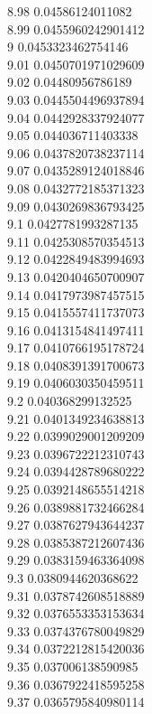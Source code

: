 {8.98	0.04586124011082\\
8.99	0.0455960242901412\\
9	0.0453323462754146\\
9.01	0.0450701971029609\\
9.02	0.04480956786189\\
9.03	0.0445504496937894\\
9.04	0.0442928337924077\\
9.05	0.044036711403338\\
9.06	0.0437820738237114\\
9.07	0.0435289124018846\\
9.08	0.0432772185371323\\
9.09	0.0430269836793425\\
9.1	0.0427781993287135\\
9.11	0.0425308570354513\\
9.12	0.0422849483994693\\
9.13	0.0420404650700907\\
9.14	0.0417973987457515\\
9.15	0.0415557411737073\\
9.16	0.0413154841497411\\
9.17	0.0410766195178724\\
9.18	0.0408391391700673\\
9.19	0.0406030350459511\\
9.2	0.040368299132525\\
9.21	0.0401349234638813\\
9.22	0.0399029001209209\\
9.23	0.0396722212310743\\
9.24	0.0394428789680222\\
9.25	0.0392148655514218\\
9.26	0.0389881732466284\\
9.27	0.0387627943644237\\
9.28	0.0385387212607436\\
9.29	0.0383159463364098\\
9.3	0.0380944620368622\\
9.31	0.0378742608518889\\
9.32	0.0376553353153634\\
9.33	0.0374376780049829\\
9.34	0.0372212815420036\\
9.35	0.037006138590985\\
9.36	0.0367922418595258\\
9.37	0.0365795840980114\\
}
